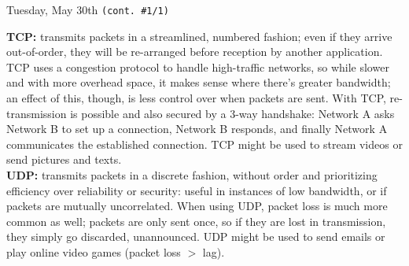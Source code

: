 \documentclass[11pt]{article}
\begin{document}
\begin{bloodorangebox}{Tuesday, May 30th \hspace{0.2cm}\texttt{(cont. \#1/1)}\vspace{-2.2em}\begin{flushright}\large{}\end{flushright}}
\begin{multicols}{2}
        \vfill
        \columnbreak
        \scriptsize\textbf{TCP:} transmits packets in a streamlined, numbered fashion; even if they arrive out-of-order, they will be re-arranged before reception by another application. TCP uses a congestion protocol to handle high-traffic networks, so while slower and with more overhead space, it makes sense where there's greater bandwidth; an effect of this, though, is less control over when packets are sent. With TCP, re-transmission is possible and also secured by a 3-way handshake: Network A asks Network B to set up a connection, Network B responds, and finally Network A communicates the established connection. TCP might be used to stream videos or send pictures and texts. \\
        \hline
        \vspace{0.75em}
        \scriptsize\textbf{UDP:} transmits packets in a discrete fashion, without order and prioritizing efficiency over reliability or security: useful in instances of low bandwidth, or if packets are mutually uncorrelated. When using UDP, packet loss is much more common as well; packets are only sent once, so if they are lost in transmission, they simply go discarded, unannounced. UDP might be used to send emails or play online video games (packet loss $>$ lag).
    \end{multicols}
\end{bloodorangebox}

\begin{center}
    \hspace{0.2cm}
    \vspace{-0.5em}
\end{center}
\end{document}

